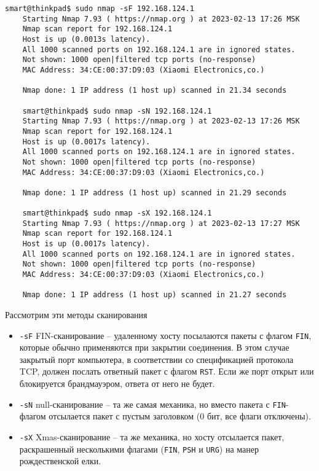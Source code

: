 \begin{Verbatim}[frame=single]
    smart@thinkpad$ sudo nmap -sF 192.168.124.1
    Starting Nmap 7.93 ( https://nmap.org ) at 2023-02-13 17:26 MSK
    Nmap scan report for 192.168.124.1
    Host is up (0.0013s latency).
    All 1000 scanned ports on 192.168.124.1 are in ignored states.
    Not shown: 1000 open|filtered tcp ports (no-response)
    MAC Address: 34:CE:00:37:D9:03 (Xiaomi Electronics,co.)

    Nmap done: 1 IP address (1 host up) scanned in 21.34 seconds

    smart@thinkpad$ sudo nmap -sN 192.168.124.1
    Starting Nmap 7.93 ( https://nmap.org ) at 2023-02-13 17:26 MSK
    Nmap scan report for 192.168.124.1
    Host is up (0.0017s latency).
    All 1000 scanned ports on 192.168.124.1 are in ignored states.
    Not shown: 1000 open|filtered tcp ports (no-response)
    MAC Address: 34:CE:00:37:D9:03 (Xiaomi Electronics,co.)

    Nmap done: 1 IP address (1 host up) scanned in 21.29 seconds

    smart@thinkpad$ sudo nmap -sX 192.168.124.1
    Starting Nmap 7.93 ( https://nmap.org ) at 2023-02-13 17:27 MSK
    Nmap scan report for 192.168.124.1
    Host is up (0.0017s latency).
    All 1000 scanned ports on 192.168.124.1 are in ignored states.
    Not shown: 1000 open|filtered tcp ports (no-response)
    MAC Address: 34:CE:00:37:D9:03 (Xiaomi Electronics,co.)

    Nmap done: 1 IP address (1 host up) scanned in 21.27 seconds
\end{Verbatim}

Рассмотрим эти методы сканирования
\begin{itemize}
    \item \texttt{-sF} FIN-сканирование -- удаленному хосту посылаются пакеты с флагом \texttt{FIN}, которые обычно применяются при закрытии соединения. В этом случае закрытый порт компьютера, в соответствии со спецификацией протокола TCP, должен послать ответный пакет с флагом \texttt{RST}. Если же порт открыт или блокируется брандмауэром, ответа от него не будет.
    \item \texttt{-sN} null-сканирование -- та же самая механика, но вместо пакета с \texttt{FIN}-флагом отсылается пакет с пустым заголовком (0 бит, все флаги отключены).
    \item \texttt{-sX} Xmas-сканирование -- та же механика, но хосту отсылается пакет, раскрашенный несколькими флагами (\texttt{FIN}, \texttt{PSH} и \texttt{URG}) на манер рождественской елки.
\end{itemize}

